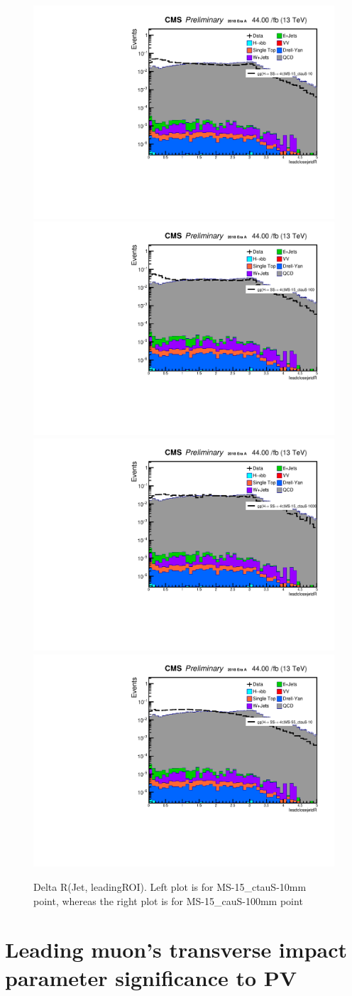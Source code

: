  \begin{figure}[h!]
   \caption{Delta R(Jet, leadingROI). Left plot is for MS-15\_ctauS-10mm point, whereas the right plot is for MS-15\_cauS-100mm point}
   \label{fig:JetDeltaRleadSize}
   \centering
   \includegraphics[width=0.47\linewidth]{figs/log_AnalysisNote_MS-15_ctauS-10_leadcloseJetdR.pdf}
   \includegraphics[width=0.47\linewidth]{figs/log_AnalysisNote_MS-15_ctauS-100_leadcloseJetdR.pdf}
   \includegraphics[width=0.47\linewidth]{figs/log_AnalysisNote_MS-15_ctauS-1000_leadcloseJetdR.pdf}
   \includegraphics[width=0.47\linewidth]{figs/log_AnalysisNote_MS-55_ctauS-10_leadcloseJetdR.pdf}
 \end{figure}

\section{Leading muon's transverse impact parameter significance to PV}\label{ref:muIP}

